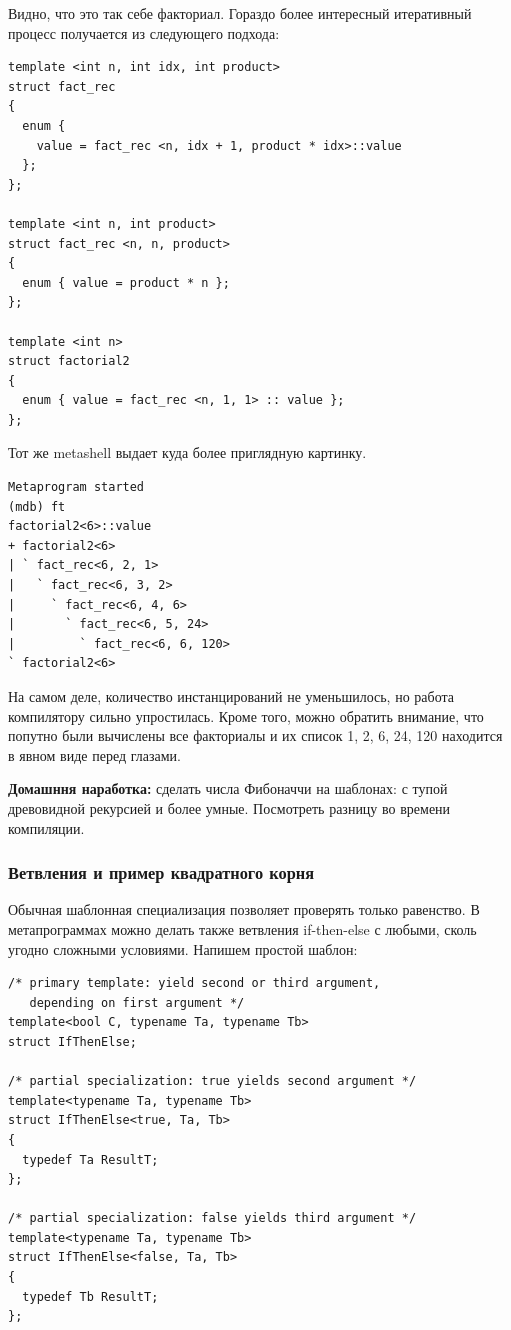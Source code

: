 \documentclass[a4paper,12pt,oneside]{article}
\begin{document}
Видно, что это так себе факториал. Гораздо более интересный итеративный процесс получается из следующего подхода:

\begin{lstlisting}
template <int n, int idx, int product>
struct fact_rec
{
  enum { 
    value = fact_rec <n, idx + 1, product * idx>::value
  };
};

template <int n, int product>
struct fact_rec <n, n, product>
{
  enum { value = product * n };
};

template <int n>
struct factorial2
{
  enum { value = fact_rec <n, 1, 1> :: value };
};
\end{lstlisting}

Тот же metashell выдает куда более приглядную картинку.

\begin{verbatim}
Metaprogram started
(mdb) ft
factorial2<6>::value
+ factorial2<6> 
| ` fact_rec<6, 2, 1> 
|   ` fact_rec<6, 3, 2> 
|     ` fact_rec<6, 4, 6> 
|       ` fact_rec<6, 5, 24> 
|         ` fact_rec<6, 6, 120> 
` factorial2<6> 
\end{verbatim}

На самом деле, количество инстанцирований не уменьшилось, но работа компилятору сильно упростилась. Кроме того, можно обратить внимание, что попутно были вычислены все факториалы и их список 1, 2, 6, 24, 120 находится в явном виде перед глазами.

\textbf{Домашння наработка:} сделать числа Фибоначчи на шаблонах: с тупой древовидной рекурсией и более умные. Посмотреть разницу во времени компиляции.

\subsubsection{Ветвления и пример квадратного корня}\label{TemplateIfElse}

Обычная шаблонная специализация позволяет проверять только равенство. В метапрограммах можно делать также ветвления if-then-else с любыми, сколь угодно сложными условиями. Напишем простой шаблон:

\begin{lstlisting}
/* primary template: yield second or third argument, 
   depending on first argument */
template<bool C, typename Ta, typename Tb> 
struct IfThenElse; 

/* partial specialization: true yields second argument */
template<typename Ta, typename Tb> 
struct IfThenElse<true, Ta, Tb> 
{ 
  typedef Ta ResultT; 
}; 

/* partial specialization: false yields third argument */
template<typename Ta, typename Tb> 
struct IfThenElse<false, Ta, Tb> 
{ 
  typedef Tb ResultT; 
}; 
\end{lstlisting}
\end{document}
